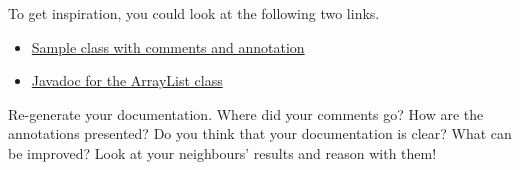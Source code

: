 \documentclass[a4paper, english]{article}
\begin{document}
        To get inspiration, you could look at the following two links.

        \begin{itemize}
            \item \href{https://klistra.in/YS4JKmal}{Sample class with comments and annotation}
            \item \href{https://docs.oracle.com/en/java/javase/13/docs/api/java.base/java/util/ArrayList.html}{Javadoc for the ArrayList class}
        \end{itemize}

        Re-generate your documentation. Where did your comments go? How are the annotations presented? Do you think that your documentation is clear? What can be improved? Look at your neighbours' results and reason with them!
\end{document}
